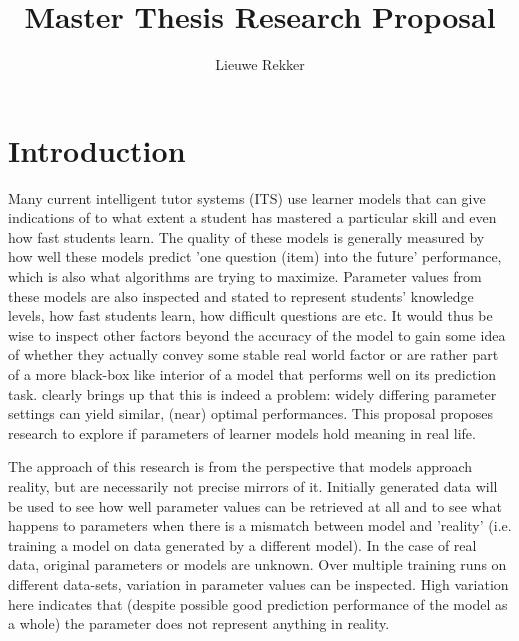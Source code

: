 \documentclass{article}
\begin{document}
\title{Master Thesis Research Proposal}
\author{Lieuwe Rekker}
\maketitle
\nocite{labelcombi}
\nocite{lftransfer}
\nocite{offtaskmodel}
\nocite{POKS1}
\nocite{matrixfact}
\nocite{importance}
\nocite{knowledgeproblem}
\nocite{modelreview}
\nocite{engagement}
\nocite{engageproficiency}
\nocite{eirt}

\section{Introduction}
Many current intelligent tutor systems (ITS) use learner models that can give indications of to what extent a student has mastered a particular skill and even how fast students learn. The quality of these models is generally measured by how well these models predict 'one question (item) into the future' performance, which is also what algorithms are trying to maximize. Parameter values from these models are also inspected and stated to represent students' knowledge levels, how fast students learn, how difficult questions are etc. It would thus be wise to inspect other factors beyond the accuracy of the model to gain some idea of whether they actually convey some stable real world factor or are rather part of a more black-box like interior of a model that performs well on its prediction task. \cite{knowledgeproblem} clearly brings up that this is indeed a problem: widely differing parameter settings can yield similar, (near) optimal performances. This proposal proposes research to explore if parameters of learner models hold meaning in real life.

The approach of this research is from the perspective that models approach reality, but are necessarily not precise mirrors of it. Initially generated data will be used to see how well parameter values can be retrieved at all and to see what happens to parameters when there is a mismatch between model and 'reality' (i.e. training a model on data generated by a different model). In the case of real data, original parameters or models are unknown. Over multiple training runs on different data-sets, variation in parameter values can be inspected. High variation here indicates that (despite possible good prediction performance of the model as a whole) the parameter does not represent anything in reality.
\end{document}
